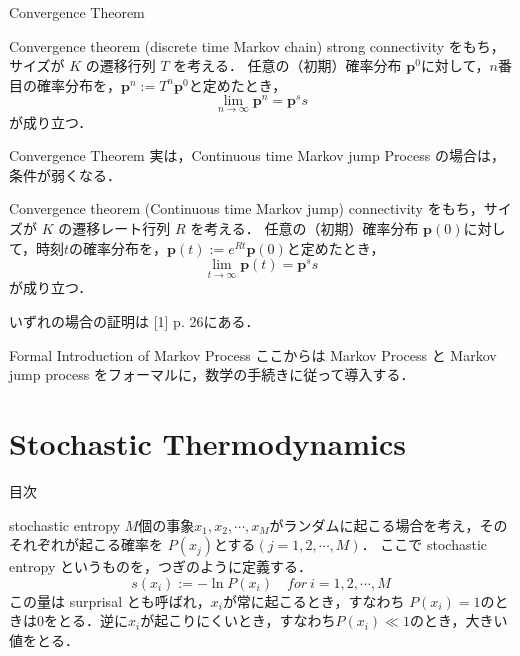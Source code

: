 \documentclass[aspectratio=169, dvipdfmx, 11pt,uplatex]{beamer} %
\begin{document}
\begin{frame}{Convergence Theorem}
  \begin{block}{Convergence theorem (discrete time Markov chain)}
    strong connectivity をもち，サイズが $K$ の遷移行列 $T$ を考える．
    任意の（初期）確率分布 $\mathbf{p}^0$に対して，$n$番目の確率分布を，$\mathbf{p}^n := T^n \mathbf{p}^0 $と定めたとき，
    \begin{equation}
      \lim_{n \to \infty } \mathbf{p}^n = \mathbf{p}^ss
    \end{equation}
    が成り立つ．
  \end{block}
\end{frame}

\begin{frame}{Convergence Theorem}
  実は，Continuous time Markov jump Process の場合は，条件が弱くなる．
  \begin{block}{Convergence theorem (Continuous time Markov jump)}
    connectivity をもち，サイズが $K$ の遷移レート行列 $R$ を考える．
    任意の（初期）確率分布 $\mathbf{p} (0)$に対して，時刻$t$の確率分布を，$\mathbf{p} (t) := e^{Rt} \mathbf{p} (0) $と定めたとき，
    \begin{equation}
      \lim_{t \to \infty } \mathbf{p} (t) = \mathbf{p}^ss
    \end{equation}
    が成り立つ．
  \end{block}
  いずれの場合の証明は [1] p. 26にある．
\end{frame}

\begin{frame}{Formal Introduction of Markov Process}
  ここからは Markov Process と Markov jump process をフォーマルに，数学の手続きに従って導入する．
\end{frame}

\section{Stochastic Thermodynamics}

\begin{frame}{目次}
  \tableofcontents[currentsection]
\end{frame}

\begin{frame}{stochastic entropy}
  $M$個の事象$x_1, x_2, \cdots, x_M$がランダムに起こる場合を考え，そのそれぞれが起こる確率を $P(x_j)$とする$(j = 1, 2, \cdots, M )$．
  ここで stochastic entropy というものを，つぎのように定義する．
  \begin{equation}
    s(x_i ) := - \ln P(x_i) \quad for \ i = 1, 2, \cdots, M 
  \end{equation}
  この量は surprisal とも呼ばれ，$x_i$が常に起こるとき，すなわち $P(x_i) = 1$のときは$0$をとる．逆に$x_i$が起こりにくいとき，すなわち$P(x_i) \ll  1$のとき，大きい値をとる．
\end{frame}
\end{document}
